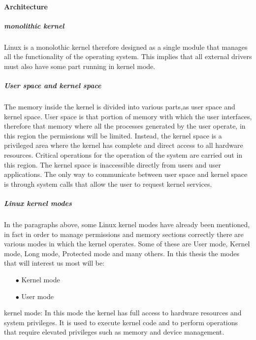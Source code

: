     \paragraph{Architecture}
    \subparagraph{monolithic kernel}
    Linux is a monolothic kernel therefore designed as a single module that manages all the functionality of the operating system.\newline
    This implies that all external drivers must also have some part running in kernel mode.\newline
    \subparagraph{User space and kernel space}
    The memory inside the kernel is divided into various parts,as user space and kernel space.\newline
    User space is that portion of memory with which the user interfaces, therefore that memory where all the processes generated by the user operate, in this region the permissions will be limited.\newline
    Instead, the kernel space is a privileged area where the kernel has complete and direct access to all hardware resources.\newline
    Critical operations for the operation of the system are carried out in this region.\newline
    The kernel space is inaccessible directly from users and user applications.\newline
    The only way to communicate between user space and kernel space is through system calls that allow the user to request kernel services.\newline
    \subparagraph{Linux kernel modes}
    In the paragraphs above, some Linux kernel modes have already been mentioned, in fact in order to manage permissions and memory sections correctly there are various modes in which the kernel operates.\newline
    Some of these are User mode, Kernel mode, Long mode, Protected mode and many others.\newline
    In this thesis the modes that will interest us most will be:\newline
    \begin{itemize}
        \item[$\bullet$] Kernel mode
        \item[$\bullet$] User mode
    \end{itemize}
    kernel mode: In this mode the kernel has full access to hardware resources and system privileges.\newline
    It is used to execute kernel code and to perform operations that require elevated privileges such as memory and device management.\newline
